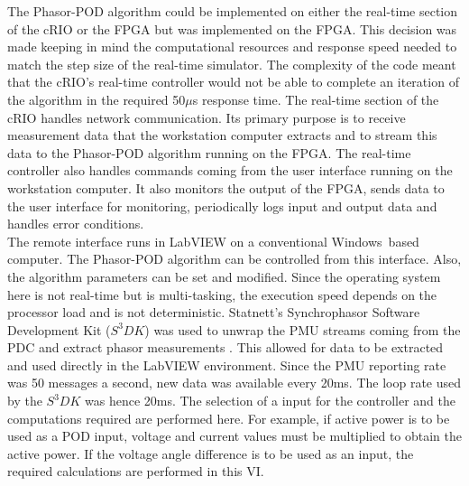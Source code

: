 \documentclass[journal]{IEEEtran}
\begin{document}
The Phasor-POD algorithm could be implemented on either the real-time section of the cRIO or the FPGA but was implemented on the FPGA. This decision was made keeping in mind the computational resources and response speed needed to match the step size of the real-time simulator. The complexity of the code meant that the cRIO\rq{s} real-time controller would not be able to complete an iteration of the algorithm in the required 50$\mu$s response time. The real-time section of the cRIO handles network communication. Its primary purpose is to receive measurement data that the workstation computer extracts and to stream this data to the Phasor-POD algorithm running on the FPGA. The real-time controller also handles commands coming from the user interface running on the workstation computer.  It also monitors the output of the FPGA, sends data to the user interface for monitoring, periodically logs input and output data and handles error  conditions.\\

The remote interface runs in LabVIEW on a conventional Windows\textregistered~based computer. The Phasor-POD algorithm can be controlled from this interface. Also, the algorithm parameters can be set and modified. Since the operating system here is not real-time but is multi-tasking, the execution speed depends on the processor load and is not deterministic. Statnett's Synchrophasor Software Development Kit ($S^{3}DK$) was used to unwrap the PMU streams coming from the PDC and extract phasor measurements \cite{SDK}. This allowed for data to be extracted and used directly in the LabVIEW environment. Since the PMU reporting rate was 50 messages a second, new data was available every 20ms. The loop rate used by the $S^{3}DK$ was hence 20ms. The selection of a input for the controller and the computations required are performed here. For example, if active power is to be used as a POD input, voltage and current values must be multiplied to obtain the active power. If the voltage angle difference is to be used as an input, the required calculations are performed in this VI.\\


\end{document}
